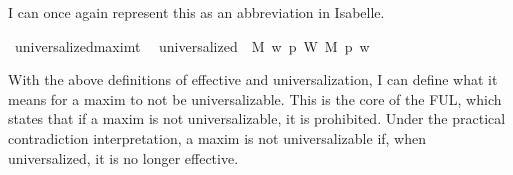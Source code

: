 \begin{isabellebody}
\begin{isamarkuptext}
I can once again represent this as an abbreviation in Isabelle.%
\end{isamarkuptext}\isamarkuptrue%
\isamarkupfalse%
\ universalized{\isacharcolon}{\isacharcolon}{\isachardoublequoteopen}maxim{\isasymRightarrow}t{\isachardoublequoteclose}\ \ \isanewline
{\isachardoublequoteopen}universalized\ {\isasymequiv}\ {\isasymlambda}M{\isachardot}\ {\isacharparenleft}{\isasymlambda}w{\isachardot}\ {\isacharparenleft}{\isasymforall}p{\isachardot}\ {\isacharparenleft}W\ M\ p{\isacharparenright}\ w{\isacharparenright}{\isacharparenright}{\isachardoublequoteclose}\isanewline
%
%
\begin{isamarkuptext}%
With the above definitions of effective and universalization, I can define what it means for 
a maxim to not be universalizable. This is the core of the FUL, which states that if a maxim is not 
universalizable, it is prohibited. Under the practical contradiction interpretation, a maxim is 
not universalizable if, when universalized, it is no longer effective.


\end{isamarkuptext}
\end{isabellebody}
